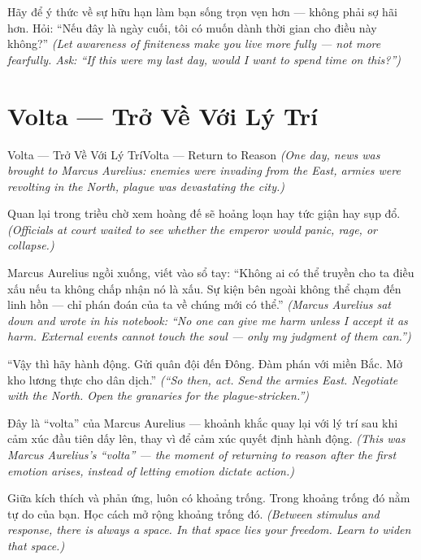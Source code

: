 \begin{baihoc}
Hãy để ý thức về sự hữu hạn làm bạn sống trọn vẹn hơn — không phải sợ hãi hơn. Hỏi: ``Nếu đây là ngày cuối, tôi có muốn dành thời gian cho điều này không?''
\textit{(Let awareness of finiteness make you live more fully — not more fearfully. Ask: ``If this were my last day, would I want to spend time on this?'')}
\end{baihoc}
\ngancach

\section{Volta — Trở Về Với Lý Trí}
\begin{truyen}{Volta — Trở Về Với Lý Trí}{Volta — Return to Reason}
\textit{(One day, news was brought to Marcus Aurelius: enemies were invading from the East, armies were revolting in the North, plague was devastating the city.)}

Quan lại trong triều chờ xem hoàng đế sẽ hoảng loạn hay tức giận hay sụp đổ.
\textit{(Officials at court waited to see whether the emperor would panic, rage, or collapse.)}

Marcus Aurelius ngồi xuống, viết vào sổ tay: ``Không ai có thể truyền cho ta điều xấu nếu ta không chấp nhận nó là xấu. Sự kiện bên ngoài không thể chạm đến linh hồn — chỉ phán đoán của ta về chúng mới có thể.''
\textit{(Marcus Aurelius sat down and wrote in his notebook: ``No one can give me harm unless I accept it as harm. External events cannot touch the soul — only my judgment of them can.'')}

``Vậy thì hãy hành động. Gửi quân đội đến Đông. Đàm phán với miền Bắc. Mở kho lương thực cho dân dịch.''
\textit{(``So then, act. Send the armies East. Negotiate with the North. Open the granaries for the plague-stricken.'')}

Đây là ``volta'' của Marcus Aurelius — khoảnh khắc quay lại với lý trí sau khi cảm xúc đầu tiên dấy lên, thay vì để cảm xúc quyết định hành động.
\textit{(This was Marcus Aurelius's ``volta'' — the moment of returning to reason after the first emotion arises, instead of letting emotion dictate action.)}

\end{truyen}

\begin{baihoc}
Giữa kích thích và phản ứng, luôn có khoảng trống. Trong khoảng trống đó nằm tự do của bạn. Học cách mở rộng khoảng trống đó.
\textit{(Between stimulus and response, there is always a space. In that space lies your freedom. Learn to widen that space.)}
\end{baihoc}
\ngancach

